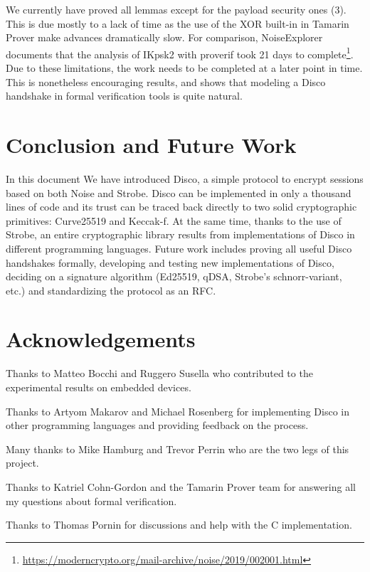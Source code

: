 \documentclass{article}
\begin{document}
We currently have proved all lemmas except for the payload security ones (3). This is due mostly to a lack of time as the use of the XOR built-in in Tamarin Prover make advances dramatically slow. For comparison, NoiseExplorer documents that the analysis of IKpsk2 with proverif took 21 days to complete\footnote{\url{https://moderncrypto.org/mail-archive/noise/2019/002001.html}}. Due to these limitations, the work needs to be completed at a later point in time. This is nonetheless encouraging results, and shows that modeling a Disco handshake in formal verification tools is quite natural.


\section{Conclusion and Future Work}

In this document We have introduced Disco, a simple protocol to encrypt sessions based on both Noise and Strobe. Disco can be implemented in only a thousand lines of code and its trust can be traced back directly to two solid cryptographic primitives: Curve25519 and Keccak-f. At the same time, thanks to the use of Strobe, an entire cryptographic library results from implementations of Disco in different programming languages. Future work includes proving all useful Disco handshakes formally, developing and testing new implementations of Disco, deciding on a signature algorithm (Ed25519, qDSA, Strobe's schnorr-variant, etc.) and standardizing the protocol as an RFC.

\section*{Acknowledgements}

Thanks to Matteo Bocchi and Ruggero Susella who contributed to the experimental results on embedded devices.

Thanks to Artyom Makarov and Michael Rosenberg for implementing Disco in other programming languages and providing feedback on the process.

Many thanks to Mike Hamburg and Trevor Perrin who are the two legs of this project.

Thanks to Katriel Cohn-Gordon and the Tamarin Prover team for answering all my questions about formal verification.

Thanks to Thomas Pornin for discussions and help with the C implementation.

\newpage
\printbibliography
\end{document}
